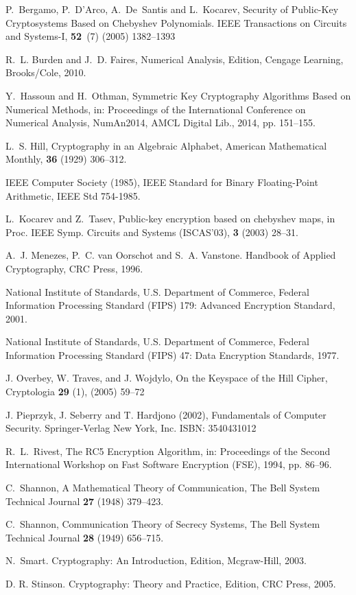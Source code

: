 \documentclass[10pt,journal]{IEEEtran}
\begin{document}
\begin{thebibliography}{1}

 P.~Bergamo, P.~D'Arco, A.~De~Santis and L.~Kocarev, Security of Public-Key Cryptosystems Based on Chebyshev Polynomials. IEEE Transactions on Circuits and Systems-I, \textbf{52}~(7) (2005) 1382--1393

 R.~L. Burden and J.~D. Faires, Numerical Analysis,  Edition, Cengage Learning, Brooks/Cole, 2010.

 Y.~Hassoun and H.~Othman, Symmetric {K}ey   {C}ryptography {A}lgorithms {B}ased on {N}umerical {M}ethods, in:   Proceedings of the  International Conference on Numerical Analysis, NumAn2014, AMCL Digital Lib., 2014, pp. 151--155.

 L.~S. Hill, {Cryptography in an Algebraic Alphabet}, American Mathematical Monthly, \textbf{36} (1929) 306--312.

 IEEE Computer Society (1985), IEEE Standard for Binary Floating-Point Arithmetic, IEEE Std 754-1985. 

 L.~Kocarev and Z.~Tasev, Public-key encryption based on chebyshev maps, in Proc. IEEE Symp. Circuits and Systems (ISCAS'03), \textbf{3} (2003) 28--31.

 A.~J. Menezes, P.~C. van Oorschot and   S.~A. Vanstone. {Handbook of Applied Cryptography}, CRC Press, 1996.
  
 {National Institute of Standards, U.S. Department of Commerce}, {Federal Information Processing Standard (FIPS) 179:  Advanced Encryption Standard, 2001}.

 {National Institute of Standards, U.S. Department of  Commerce}, {Federal Information Processing Standard (FIPS) 47: Data   Encryption Standards, 1977}.
    
 J. Overbey, W. Traves, and J. Wojdylo, {On the Keyspace of the Hill Cipher}, Cryptologia \textbf{29} (1), (2005) 59--72

 J. Pieprzyk, J. Seberry and T. Hardjono (2002), {Fundamentals of Computer Security}. Springer-Verlag New York, Inc. ISBN: 3540431012

 R.~L.~Rivest, {The RC5 Encryption Algorithm}, in:   Proceedings of the Second International Workshop on Fast Software Encryption (FSE), 1994, pp. 86--96.

 C.~Shannon, {A Mathematical Theory of Communication}, The Bell System Technical Journal \textbf{27} (1948) 379--423.

 C.~Shannon, {Communication Theory of Secrecy Systems}, The Bell System Technical Journal \textbf{28} (1949) 656--715.

 N.~Smart. {Cryptography: An Introduction,  Edition}, Mcgraw-Hill, 2003.

 D. R. Stinson. {Cryptography: Theory and Practice,  Edition}, CRC Press, 2005.

\end{thebibliography}
\end{document}
